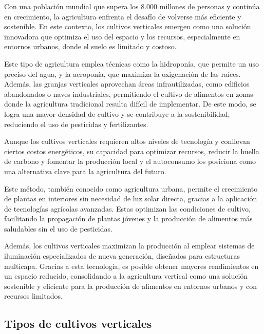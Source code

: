Con una población mundial que supera los 8.000 millones de personas y continúa en crecimiento, la agricultura enfrenta el desafío de volverse más eficiente y sostenible. En este contexto, los cultivos verticales emergen como una solución innovadora que optimiza el uso del espacio y los recursos, especialmente en entornos urbanos, donde el suelo es limitado y costoso.

Este tipo de agricultura emplea técnicas como la hidroponía, que permite un uso preciso del agua, y la aeroponía, que maximiza la oxigenación de las raíces. Además, las granjas verticales aprovechan áreas infrautilizadas, como edificios abandonados o naves industriales, permitiendo el cultivo de alimentos en zonas donde la agricultura tradicional resulta difícil de implementar. De este modo, se logra una mayor densidad de cultivo y se contribuye a la sostenibilidad, reduciendo el uso de pesticidas y fertilizantes.

Aunque los cultivos verticales requieren altos niveles de tecnología y conllevan ciertos costos energéticos, su capacidad para optimizar recursos, reducir la huella de carbono y fomentar la producción local y el autoconsumo los posiciona como una alternativa clave para la agricultura del futuro.

Este método, también conocido como agricultura urbana, permite el crecimiento de plantas en interiores sin necesidad de luz solar directa, gracias a la aplicación de tecnologías agrícolas avanzadas. Estas optimizan las condiciones de cultivo, facilitando la propagación de plantas jóvenes y la producción de alimentos más saludables sin el uso de pesticidas.

Además, los cultivos verticales maximizan la producción al emplear sistemas de iluminación especializados de nueva generación, diseñados para estructuras multicapa. Gracias a esta tecnología, es posible obtener mayores rendimientos en un espacio reducido, consolidando a la agricultura vertical como una solución sostenible y eficiente para la producción de alimentos en entornos urbanos y con recursos limitados.

\subsection{Tipos de cultivos verticales}



